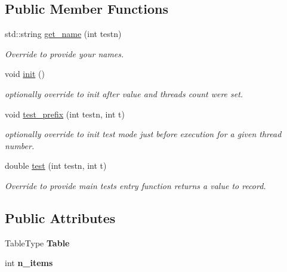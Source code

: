 \subsection*{Public Member Functions}
\begin{DoxyCompactItemize}
\item 
\hypertarget{structUniques_ac148c6e8287d46a8c97e4ec9638b081c}{}std\+::string \hyperlink{structUniques_ac148c6e8287d46a8c97e4ec9638b081c}{get\+\_\+name} (int testn)\label{structUniques_ac148c6e8287d46a8c97e4ec9638b081c}

\begin{DoxyCompactList}\small\item\em Override to provide your names. \end{DoxyCompactList}\item 
\hypertarget{structUniques_aa953d035c8f4935d9676782939066864}{}void \hyperlink{structUniques_aa953d035c8f4935d9676782939066864}{init} ()\label{structUniques_aa953d035c8f4935d9676782939066864}

\begin{DoxyCompactList}\small\item\em optionally override to init after value and threads count were set. \end{DoxyCompactList}\item 
\hypertarget{structUniques_a83f59fe83325141e44d276d3f32ce1c7}{}void \hyperlink{structUniques_a83f59fe83325141e44d276d3f32ce1c7}{test\+\_\+prefix} (int testn, int t)\label{structUniques_a83f59fe83325141e44d276d3f32ce1c7}

\begin{DoxyCompactList}\small\item\em optionally override to init test mode just before execution for a given thread number. \end{DoxyCompactList}\item 
\hypertarget{structUniques_ab384da8290e5cfcbe1ef3d93658c543e}{}double \hyperlink{structUniques_ab384da8290e5cfcbe1ef3d93658c543e}{test} (int testn, int t)\label{structUniques_ab384da8290e5cfcbe1ef3d93658c543e}

\begin{DoxyCompactList}\small\item\em Override to provide main test\textquotesingle{}s entry function returns a value to record. \end{DoxyCompactList}\end{DoxyCompactItemize}
\subsection*{Public Attributes}
\begin{DoxyCompactItemize}
\item 
\hypertarget{structUniques_aa25f22e3d3e41486e79c56fb1712312e}{}Table\+Type {\bfseries Table}\label{structUniques_aa25f22e3d3e41486e79c56fb1712312e}

\item 
\hypertarget{structUniques_afd47aa2f7ef437ac8127dd4f7d14422c}{}int {\bfseries n\+\_\+items}\label{structUniques_afd47aa2f7ef437ac8127dd4f7d14422c}

\end{DoxyCompactItemize}
